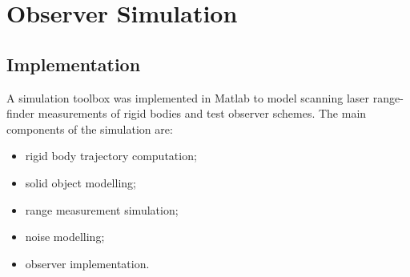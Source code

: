 \chapter{Observer Simulation} \label{chap:simulation}
\section{Implementation}
A simulation toolbox was implemented in Matlab to model scanning laser range-finder measurements of rigid bodies and test observer schemes. The main components of the simulation are:
\begin{itemize} \setlength\itemsep{-2mm}
\item rigid body trajectory computation;
\item solid object modelling;
\item range measurement simulation;
\item noise modelling;
\item observer implementation.
\end{itemize}

